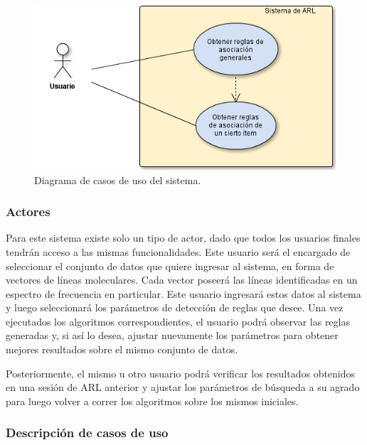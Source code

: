 \begin{figure}[h!]
\begin{center}
\includegraphics[width=14cm]{imagenes/casos_de_uso.png}
\end{center}
\vspace*{-5mm}
\caption{Diagrama de casos de uso del sistema.}
\label{fig:cases}
\end{figure}

\subsubsection{Actores}

Para este sistema existe solo un tipo de actor, dado que todos los usuarios finales tendrán acceso a las mismas funcionalidades. Este usuario será el encargado de seleccionar el conjunto de datos que quiere ingresar al sistema, en forma de vectores de líneas moleculares. Cada vector poseerá las líneas identificadas en un espectro de frecuencia en particular. Este usuario ingresará estos datos al sistema y luego seleccionará los parámetros de detección de reglas que desee. Una vez ejecutados los algoritmos correspondientes, el usuario podrá observar las reglas generadas y, si así lo desea, ajustar nuevamente los parámetros para obtener mejores resultados sobre el mismo conjunto de datos.

Posteriormente, el mismo u otro usuario podrá verificar los resultados obtenidos en una sesión de ARL anterior y ajustar los parámetros de búsqueda a su agrado para luego volver a correr los algoritmos sobre los mismos iniciales.

\subsubsection{Descripción de casos de uso}


